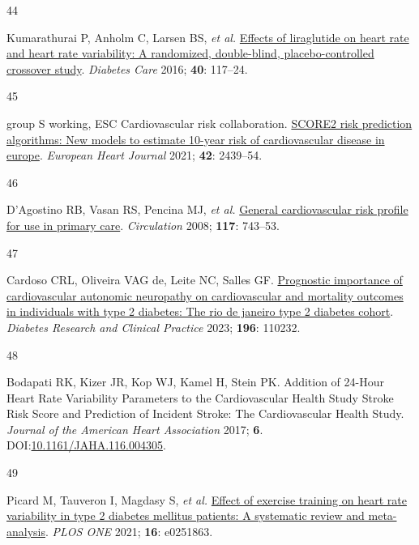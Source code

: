 \documentclass[
  a4paper,
  headsepline=true,
  open=any]{scrbook}
\newlength{\cslhangindent}
\newlength{\csllabelwidth}
\newlength{\cslentryspacingunit} %
\newenvironment{CSLReferences}[2] %
 {%
  \setlength{\parindent}{0pt}
  \ifodd #1
  \let\oldpar\par
  \def\par{\hangindent=\cslhangindent\oldpar}
  \fi
  \setlength{\parskip}{#2\cslentryspacingunit}
 }%
 {}
\newcommand{\CSLLeftMargin}[1]{\parbox[t]{\csllabelwidth}{#1}}
\newcommand{\CSLRightInline}[1]{\parbox[t]{\linewidth - \csllabelwidth}{#1}\break}
\begin{document}
\begin{CSLReferences}{0}{0}
\leavevmode{}%
\CSLLeftMargin{44 }%
\CSLRightInline{Kumarathurai P, Anholm C, Larsen BS, \emph{et al.}
\href{https://doi.org/10.2337/dc16-1580}{Effects of liraglutide on heart
rate and heart rate variability: A randomized, double-blind,
placebo-controlled crossover study}. \emph{Diabetes Care} 2016;
\textbf{40}: 117--24.}

\leavevmode{}%
\CSLLeftMargin{45 }%
\CSLRightInline{group S working, ESC Cardiovascular risk collaboration.
\href{https://doi.org/10.1093/eurheartj/ehab309}{SCORE2 risk prediction
algorithms: New models to estimate 10-year risk of cardiovascular
disease in europe}. \emph{European Heart Journal} 2021; \textbf{42}:
2439--54.}

\leavevmode{}%
\CSLLeftMargin{46 }%
\CSLRightInline{D'Agostino RB, Vasan RS, Pencina MJ, \emph{et al.}
\href{https://doi.org/10.1161/CIRCULATIONAHA.107.699579}{General
cardiovascular risk profile for use in primary care}. \emph{Circulation}
2008; \textbf{117}: 743--53.}

\leavevmode{}%
\CSLLeftMargin{47 }%
\CSLRightInline{Cardoso CRL, Oliveira VAG de, Leite NC, Salles GF.
\href{https://doi.org/10.1016/j.diabres.2022.110232}{Prognostic
importance of cardiovascular autonomic neuropathy on cardiovascular and
mortality outcomes in individuals with type 2 diabetes: The rio de
janeiro type 2 diabetes cohort}. \emph{Diabetes Research and Clinical
Practice} 2023; \textbf{196}: 110232.}

\leavevmode{}%
\CSLLeftMargin{48 }%
\CSLRightInline{Bodapati RK, Kizer JR, Kop WJ, Kamel H, Stein PK.
Addition of 24-Hour Heart Rate Variability Parameters to the
Cardiovascular Health Study Stroke Risk Score and Prediction of Incident
Stroke: The Cardiovascular Health Study. \emph{Journal of the American
Heart Association} 2017; \textbf{6}.
DOI:\href{https://doi.org/10.1161/JAHA.116.004305}{10.1161/JAHA.116.004305}.}

\leavevmode{}%
\CSLLeftMargin{49 }%
\CSLRightInline{Picard M, Tauveron I, Magdasy S, \emph{et al.}
\href{https://doi.org/10.1371/journal.pone.0251863}{Effect of exercise
training on heart rate variability in type 2 diabetes mellitus patients:
A systematic review and meta-analysis}. \emph{PLOS ONE} 2021;
\textbf{16}: e0251863.}


\end{CSLReferences}
\end{document}
